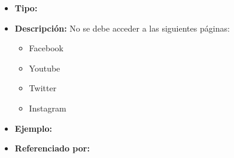   \begin{itemize}
    \item \textbf{Tipo:}  
    \item \textbf{Descripción:} No se debe acceder a las siguientes páginas:
      \begin{itemize}
          \item Facebook
          \item Youtube
          \item Twitter
          \item Instagram 
      \end{itemize} 
    \item \textbf{Ejemplo:}
    \item \textbf{Referenciado por:}  \\
  \end{itemize}